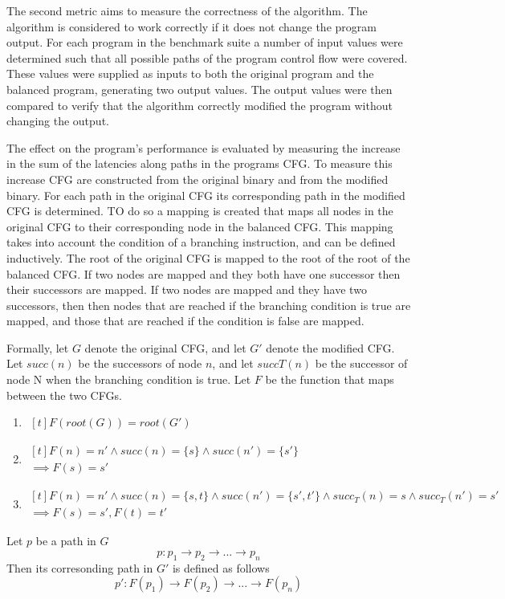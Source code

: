 The second metric aims to measure the correctness of the algorithm. The algorithm is considered to work correctly if it does not change the program output. For each program in the benchmark suite a number of input values were determined such that all possible paths of the program control flow were covered.
These values were supplied as inputs to both the original program and the balanced program, generating two output values. The output values were then compared to 
verify that the algorithm correctly modified the program without changing the output. 

The effect on the program's performance is evaluated by measuring the increase in the sum of the latencies along paths in the programs CFG. 
To measure this increase CFG are constructed from the original binary and from the modified binary. 
For each path in the original CFG its corresponding path in the modified CFG is determined. TO do so a mapping is created that maps all nodes in the original CFG to their corresponding node in the balanced CFG. 
This mapping takes into account the condition of a branching instruction, and can be defined inductively. 
The root of the original CFG is mapped to the root of the root of the balanced CFG. 
If two nodes are mapped and they both have one successor then their successors are mapped. 
If two nodes are mapped and they have two successors, then then nodes that are reached if the branching condition is true are mapped,
and those that are reached if the condition is false are mapped.

Formally, let $G$ denote the original CFG, and let $G'$ denote the modified CFG. Let $succ(n)$ be the successors of node $n$, and let $succT(n)$ be 
the successor of node N when the branching condition is true. Let $F$ be the function that maps between the two CFGs.  
\begin{enumerate}
    \item $\begin{aligned}[t]
    F(root(G)) = root(G')
\end{aligned}$
\item $\begin{aligned}[t]
    F(n) = n' \land succ(n) = \{s\} \land succ(n')=\{s'\} \\ 
    \implies F(s)=s'
\end{aligned}$
\item $\begin{aligned}[t]
    F(n) = n' \land succ(n) = \{s, t\} \land succ(n')=\{s', t'\} \land succ_T(n)=s \land succ_T(n') = s'\\
    \implies F(s)=s', F(t) = t'
\end{aligned}$
\end{enumerate}
Let $p$ be a path in $G$
$$ p: p_1 \rightarrow p_2 \rightarrow ... \rightarrow p_n$$
Then its corresonding path in $G'$ is defined as follows 
$$ p': F(p_1) \rightarrow F(p_2) \rightarrow ... \rightarrow F(p_n)$$

